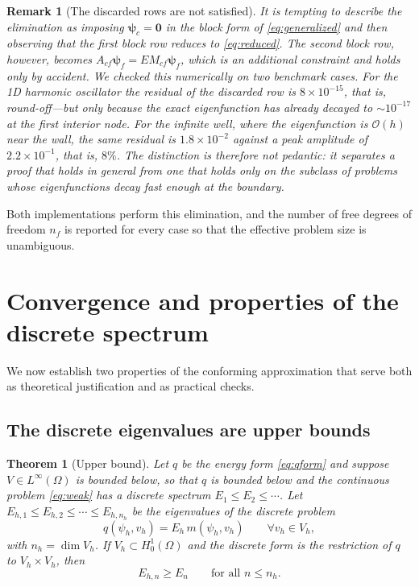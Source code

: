 \documentclass[pdflatex,sn-mathphys-num]{sn-jnl}
\theoremstyle{thmstyleone}%
\newtheorem{theorem}{Theorem}%
\theoremstyle{thmstyletwo}%
\newtheorem{remark}{Remark}%
\theoremstyle{thmstylethree}%
\begin{document}
\begin{remark}[The discarded rows are not satisfied]\label{rem:elimrows}
It is tempting to describe the elimination as imposing
$\boldsymbol{\psi}_c = \mathbf{0}$ in the block form of \eqref{eq:generalized}
and then observing that the first block row reduces to \eqref{eq:reduced}. The
second block row, however, becomes
$A_{cf}\boldsymbol{\psi}_f = E M_{cf}\boldsymbol{\psi}_f$, which is an
additional constraint and holds only by accident. We checked this numerically on
two benchmark cases. For the 1D harmonic oscillator the residual of the
discarded row is $8\times10^{-15}$, that is, round-off---but only because the
exact eigenfunction has already decayed to $\sim10^{-17}$ at the first interior
node. For the infinite well, where the eigenfunction is $\mathcal{O}(h)$ near
the wall, the same residual is $1.8\times10^{-2}$ against a peak amplitude of
$2.2\times10^{-1}$, that is, $8\%$. The distinction is therefore not pedantic:
it separates a proof that holds in general from one that holds only on the
subclass of problems whose eigenfunctions decay fast enough at the boundary.
\end{remark}

Both implementations perform this elimination, and the number of free degrees of
freedom $n_f$ is reported for every case so that the effective problem size is
unambiguous.

\section{Convergence and properties of the discrete spectrum}\label{sec:convergence}

We now establish two properties of the conforming approximation that serve both
as theoretical justification and as practical checks.

\subsection{The discrete eigenvalues are upper bounds}

\begin{theorem}[Upper bound]\label{thm:upper}
Let $q$ be the energy form \eqref{eq:qform} and suppose $V \in L^\infty(\Omega)$
is bounded below, so that $q$ is bounded below and the continuous problem
\eqref{eq:weak} has a discrete spectrum $E_1 \le E_2 \le \cdots$. Let
$E_{h,1} \leq E_{h,2} \leq \cdots \leq E_{h,n_h}$ be the eigenvalues of the
discrete problem
%
\begin{equation}\label{eq:discrete}
  q(\psi_h, v_h) = E_h\, m(\psi_h, v_h)
  \qquad \forall v_h \in V_h ,
\end{equation}
%
with $n_h = \dim V_h$. If $V_h \subset H^1_0(\Omega)$ \emph{and the discrete form
is the restriction of $q$ to $V_h \times V_h$}, then
%
\begin{equation}
  E_{h,n} \geq E_n \qquad \text{for all } n \leq n_h .
\end{equation}
\end{theorem}
\end{document}
